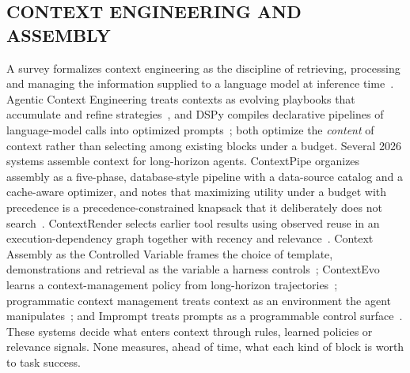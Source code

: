 
\subsection{CONTEXT ENGINEERING AND ASSEMBLY}
A survey formalizes context engineering as the discipline of retrieving, processing and managing the information supplied
to a language model at inference time~\cite{cesurvey2025}. Agentic Context Engineering treats contexts as evolving
playbooks that accumulate and refine strategies~\cite{ace2025}, and DSPy compiles declarative pipelines of language-model
calls into optimized prompts~\cite{dspy2023}; both optimize the \emph{content} of context rather than selecting among
existing blocks under a budget. Several 2026 systems assemble context for long-horizon agents. ContextPipe organizes
assembly as a five-phase, database-style pipeline with a data-source catalog and a cache-aware optimizer, and notes that
maximizing utility under a budget with precedence is a precedence-constrained knapsack that it deliberately does not
search~\cite{contextpipe2026}. ContextRender selects earlier tool results using observed reuse in an execution-dependency
graph together with recency and relevance~\cite{contextrender2026}. Context Assembly as the Controlled Variable frames the
choice of template, demonstrations and retrieval as the variable a harness controls~\cite{controlledvar2026}; ContextEvo
learns a context-management policy from long-horizon trajectories~\cite{contextevo2026}; programmatic context management
treats context as an environment the agent manipulates~\cite{ctxenv2026}; and Imprompt treats prompts as a programmable
control surface~\cite{imprompt2026}. These systems decide what enters context through rules, learned policies or
relevance signals. None measures, ahead of time, what each kind of block is worth to task success.

